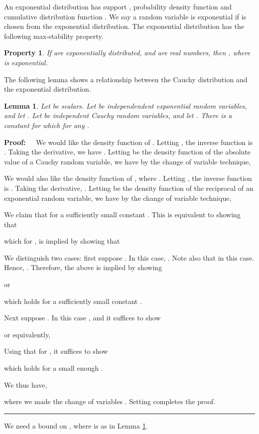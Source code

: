 \documentclass[11pt]{article}
\newtheorem{lemma}[theorem]{Lemma}
\newenvironment{proof}{\begin{trivlist} \item {\bf Proof:~~}}
  {\qed\end{trivlist}}
\def\qed{\hfill\rule{2mm}{2mm}}
\newtheorem{property}{Property}
\begin{document}
An exponential distribution has support , probability density function 
 and cumulative distribution function . 
We say a random variable  is exponential if  is chosen from the exponential distribution. 
The exponential distribution has the following max-stability property.
\begin{property}
\label{prop:exp}
If  are exponentially distributed, and  are real numbers, then 
,
where  is exponential.
\end{property}
The following lemma shows a relationship between the Cauchy distribution and the exponential distribution. 
\begin{lemma}
\label{lem:tail-squared}
Let  be scalars. 
Let  be  independendent exponential random variables, 
and let . Let  be  independent Cauchy
random variables, and let . 
There is a constant  for which for any . 

\end{lemma}
\begin{proof}
We would like the density function  of . Letting , the inverse function is . Taking the derivative,
we have . Letting  be the density function of the absolute value of a Cauchy random variable,
we have by the change of variable technique,

We would also like the density function  of , where . Letting , the inverse function is . Taking
the derivative, . Letting  be the density function of the reciprocal of an exponential random variable,
we have by the change of variable technique,

We claim that  for a sufficiently small constant . This is equivalent to showing that

which for , is implied by showing that

We distinguish two cases: first suppose . In this case, . Note also that 
 in this case. Hence,
. Therefore, the above is implied by showing

or 

which holds for a sufficiently small constant . 

Next suppose . In this case , and it suffices to show

or equivalently,

Using that  for , it suffices to show

which holds for a small enough . 

We thus have,

where we made the change of variables . Setting  completes the proof. 
\end{proof}
We need a bound on , where  is 
as in Lemma \ref{lem:tail-squared}.
\end{document}
